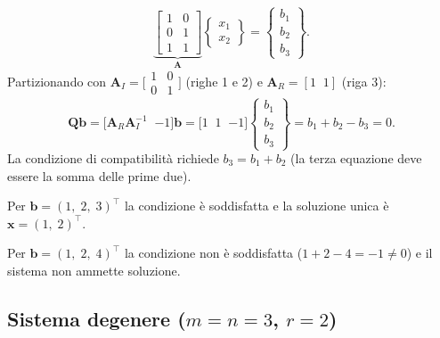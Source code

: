 \begin{equation}
	\underbrace{\left[\begin{array}{cc} 1 & 0 \\ 0 & 1 \\ 1 & 1 \end{array}\right]}_{\bm{A}}
	\begin{Bmatrix} x_1 \\ x_2 \end{Bmatrix}
	= \begin{Bmatrix} b_1 \\ b_2 \\ b_3 \end{Bmatrix}.
\end{equation}
Partizionando con $\bm{A}_I=\bigl[\begin{smallmatrix}1 & 0\\ 0 & 1\end{smallmatrix}\bigr]$ (righe 1 e 2) e $\bm{A}_R=[1\;\;1]$ (riga 3):
\begin{equation}
	\bm{Q}\bm{b}
	= \bigl[\bm{A}_R\bm{A}_I^{-1}\;\;{-1}\bigr]\bm{b}
	= \bigl[1\;\;1\;\;{-1}\bigr]
	\begin{Bmatrix} b_1 \\ b_2 \\ b_3 \end{Bmatrix}
	= b_1 + b_2 - b_3 = 0.
\end{equation}
La condizione di compatibilit\`a richiede $b_3 = b_1 + b_2$ (la terza equazione deve essere la somma delle prime due).

Per $\bm{b}=(1,\;2,\;3)^\top$ la condizione \`e soddisfatta e la soluzione unica \`e $\bm{x}=(1,\;2)^\top$.

Per $\bm{b}=(1,\;2,\;4)^\top$ la condizione non \`e soddisfatta ($1+2-4=-1\neq 0$) e il sistema non ammette soluzione.


\subsection{Sistema degenere (\texorpdfstring{$m=n=3$, $r=2$}{m=n=3, r=2})}

